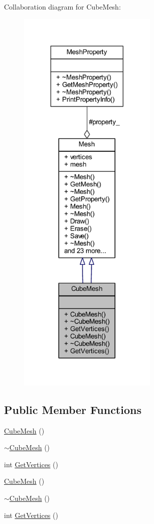 Collaboration diagram for Cube\+Mesh\+:\nopagebreak
\begin{figure}[H]
\begin{center}
\leavevmode
\includegraphics[width=188pt]{class_cube_mesh__coll__graph}
\end{center}
\end{figure}
\subsection*{Public Member Functions}
\begin{DoxyCompactItemize}
\item 
\mbox{\hyperlink{class_cube_mesh_aa096a7e837e8da5fb18b9e463ef9ea20}{Cube\+Mesh}} ()
\item 
\mbox{\hyperlink{class_cube_mesh_ab785a66ca3587acc32ff3c710dfeff47}{$\sim$\+Cube\+Mesh}} ()
\item 
int \mbox{\hyperlink{class_cube_mesh_af86c2c0b5d36a8579904cad368ae381a}{Get\+Vertices}} ()
\item 
\mbox{\hyperlink{class_cube_mesh_aa096a7e837e8da5fb18b9e463ef9ea20}{Cube\+Mesh}} ()
\item 
\mbox{\hyperlink{class_cube_mesh_ab785a66ca3587acc32ff3c710dfeff47}{$\sim$\+Cube\+Mesh}} ()
\item 
int \mbox{\hyperlink{class_cube_mesh_af86c2c0b5d36a8579904cad368ae381a}{Get\+Vertices}} ()
\end{DoxyCompactItemize}
